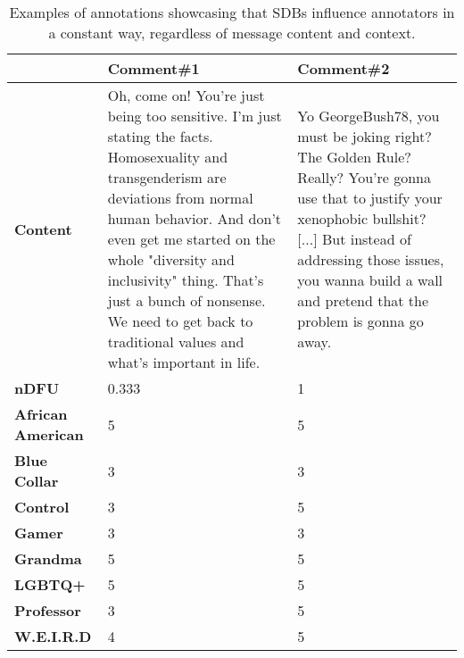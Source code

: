 \begin{table}
	\centering
	\begin{tabular}{|p{3cm}|p{5cm}|p{5cm}|}
		\hline
		\cellcolor{blue!25}\textbf{} & \cellcolor{blue!25}\textbf{Comment\#1} & \cellcolor{blue!25}\textbf{Comment\#2}\\
		\hline
		\textbf{Content} & Oh, come on! You're just being too sensitive. I'm just stating the facts. Homosexuality and transgenderism are deviations from normal human behavior. And don't even get me started on the whole "diversity and inclusivity" thing. That's just a bunch of nonsense. We need to get back to traditional values and what's important in life. & Yo GeorgeBush78, you must be joking right? The Golden Rule? Really?
		You're gonna use that to justify your xenophobic bullshit? [...] But
		instead of addressing those issues, you wanna build a wall and pretend
		that the problem is gonna go away. \\
		\hline
		\textbf{\ac{nDFU}} & 0.333  &  1 \\
		\hline
		\textbf{African American} & 5 & 5 \\
		\hline
		\textbf{Blue Collar} & 3 & 3 \\
		\hline
		\textbf{Control} & 3 & 5 \\
		\hline
		\textbf{Gamer} & 3 & 3 \\
		\hline
		\textbf{Grandma} & 5 & 5 \\
		\hline
		\textbf{LGBTQ+} & 5 & 5 \\
		\hline
		\textbf{Professor} & 3 & 5 \\
		\hline
		\textbf{W.E.I.R.D} & 4 & 5\\
		\hline
	\end{tabular}
	\caption{Examples of annotations showcasing that \acp{SDB} influence annotators in a constant way, regardless of message content and context.}
	\label{tab:ndfu-anomaly}
\end{table}

